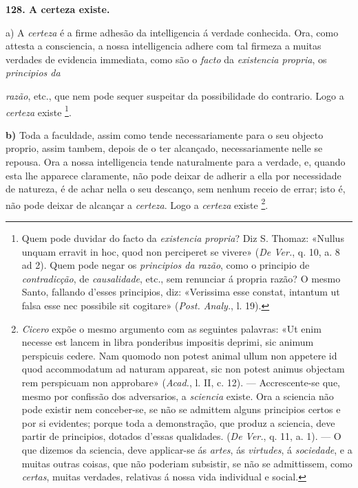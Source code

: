 \textbf{128. A certeza existe.}

a) A \emph{certeza} é a firme adhesão da intelligencia á verdade conhecida. Ora, como attesta a consciencia, a nossa intelligencia adhere com tal firmeza a muitas verdades de evidencia immediata, como são o \emph{facto} da \emph{existencia propria}, os \emph{principios da}

  \emph{razão}, etc., que nem pode sequer suspeitar da possibilidade do contrario. Logo a \emph{certeza} existe \footnote{Quem pode duvidar do facto da \emph{existencia propria}? Diz S. Thomaz: «Nullus unquam erravit in hoc, quod non perciperet se vivere» (\emph{De Ver.}, q. 10, a. 8 ad 2). Quem pode negar os \emph{principios da razão}, como o principio de \emph{contradicção}, de \emph{causalidade}, etc., sem renunciar á propria razão? O mesmo Santo, fallando d'esses principios, diz: «Verissima esse constat, intantum ut falsa esse nec possibile sit cogitare» (\emph{Post. Analy.}, l. 19).}.

\textbf{b)} Toda a faculdade, assim como tende necessariamente para o seu objecto proprio, assim tambem, depois de o ter alcançado, necessariamente nelle se repousa. Ora a nossa intelligencia tende naturalmente para a verdade, e, quando esta lhe apparece claramente, não pode deixar de adherir a ella por necessidade de natureza, é de achar nella o seu descanço, sem nenhum receio de errar; isto é, não pode deixar de alcançar a \emph{certeza}. Logo a \emph{certeza} existe \footnote{\emph{Cicero} expõe o mesmo argumento com as seguintes palavras: «Ut enim necesse est lancem in libra ponderibus impositis deprimi, sic animum perspicuis cedere. Nam quomodo non potest animal ullum non appetere id quod accommodatum ad naturam appareat, sic non potest animus objectam rem perspicuam non approbare» (\emph{Acad.}, l. II, c. 12). --- Accrescente-se que, mesmo por confissão dos adversarios, a \emph{sciencia} existe. Ora a sciencia não pode existir nem conceber-se, se não se admittem alguns principios certos e por si evidentes; porque toda a demonstração, que produz a sciencia, deve partir de principios, dotados d'essas qualidades. (\emph{De Ver.}, q. 11, a. 1). --- O que dizemos da sciencia, deve applicar-se ás \emph{artes}, ás \emph{virtudes}, á \emph{sociedade}, e a muitas outras coisas, que não poderiam subsistir, se não se admittissem, como \emph{certas}, muitas verdades, relativas á nossa vida individual e social.}.

